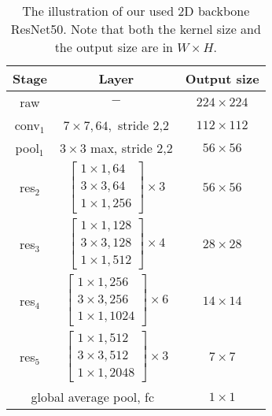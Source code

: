 \documentclass[journal]{IEEEtran}
\begin{document}
\begin{table}[!ht]
\centering
\caption{The illustration of our used 2D backbone ResNet50. Note that both the kernel size and the output size are in $W \times H$.}
\label{tab:backbone-r50}
\begin{tabular}{c|c|c}
\hline
Stage & Layer & Output size \\ \hline
raw & $-$ & $ 224 \times 224$ \\ \hline
conv$_{1}$ & $ 7 \times 7,64,$ stride 2,2 & $112 \times 112$ \\ \hline
pool$_{1}$ & $ 3 \times 3$ max, stride 2,2 & $56 \times 56$ \\ \hline
res$_{2}$ & {$\left[\begin{array}{c}1 \times 1,64 \\
 3 \times 3,64 \\
 1 \times 1,256\end{array}\right] \times 3$} & $56 \times 56$ \\ \hline
res$_{3}$ & {$\left[\begin{array}{l} 1 \times 1,128 \\
3 \times 3,128 \\
 1 \times 1,512\end{array}\right] \times 4$} & $28 \times 28$ \\ \hline
res$_{4}$ & {$\left[\begin{array}{c}1 \times 1,256 \\
 3 \times 3,256 \\
1 \times 1,1024\end{array}\right] \times 6$} & $14 \times 14$ \\ \hline
res$_{5}$ & {$\left[\begin{array}{c} 1 \times 1,512 \\
 3 \times 3,512  \\
1 \times 1,2048\end{array}\right] \times 3$} & $7 \times 7$ \\ \hline
\multicolumn{2}{c|}{ global average pool, fc } &  $1 \times 1$ \\ \hline
\end{tabular}
\end{table}
\end{document}
